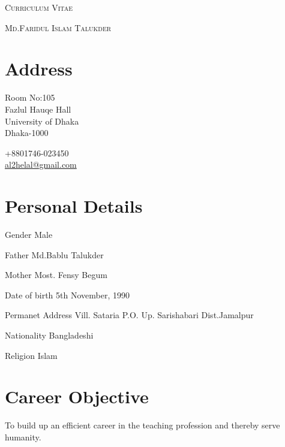 \documentclass[a4paper]{article}
\begin{document}
\pagestyle{empty}

\begin{center}
\huge{\textsc{Curriculum Vitae}}
\vspace{\baselineskip}

\Large{\textsc{Md.Faridul Islam Talukder}}\\
\end{center}
\vspace{1.5\baselineskip}

\section{Address}
\noindent
\begin{minipage}{.7\textwidth}
  Room No:105\\
  Fazlul Hauqe Hall\\
  University of Dhaka\\
  Dhaka-1000\\
\end{minipage}
\begin{minipage}{.7\textwidth}
  \faPhone{} +8801746-023450\\
  \faEnvelopeO{}  \href{mailto:al2helal@gmail.com}{al2helal@gmail.com}\\
\end{minipage}

\section{Personal Details}
\begin{CV}
  \item[Gender] Male 
  \item[Father] Md.Bablu Talukder
  \item[Mother] Most. Fensy Begum
  \item[Date of birth] 5th November, 1990
  \item[Permanet Address] Vill. Sataria P.O. Up. Sarishabari Dist.Jamalpur
  \item[Nationality] Bangladeshi
  \item[Religion] Islam
  \end{CV}

\section{Career Objective}
\begin{CV}
\item To build up an efficient career in the teaching profession and thereby serve humanity.
  \end{CV}
\end{document}
